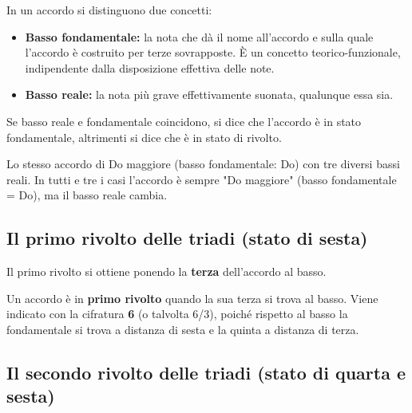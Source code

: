 \begin{definizione}
	\label{def:basso_fondamentale_reale}
	In un accordo si distinguono due concetti:
	\begin{itemize}
		\item \textbf{Basso fondamentale:} la nota che dà il nome all'accordo e sulla quale l'accordo è costruito per terze sovrapposte. È un concetto teorico-funzionale, indipendente dalla disposizione effettiva delle note.
		\item \textbf{Basso reale:} la nota più grave effettivamente suonata, qualunque essa sia.
	\end{itemize}
	
	Se basso reale e fondamentale coincidono, si dice che l'accordo è in stato fondamentale, altrimenti si dice che è in stato di rivolto.
	
\end{definizione}

\begin{esempio}
	\label{ex:basso_fond_reale}
	Lo stesso accordo di Do maggiore (basso fondamentale: Do) con tre diversi bassi reali.
	In tutti e tre i casi l'accordo è sempre "Do maggiore" (basso fondamentale = Do), ma il basso reale cambia.
\end{esempio}


\subsection{Il primo rivolto delle triadi (stato di sesta)}
\label{subsec:primo_rivolto}

Il primo rivolto si ottiene ponendo la \textbf{terza} dell'accordo al basso.

\begin{definizione}
	\label{def:primo_rivolto}
	Un accordo è in \textbf{primo rivolto} quando la sua terza si trova al basso. Viene indicato con la cifratura \textbf{6} (o talvolta 6/3), poiché rispetto al basso la fondamentale si trova a distanza di sesta e la quinta a distanza di terza.
\end{definizione}

\begin{esempio}
	\label{ex:primo_rivolto_triadi}
\end{esempio}

\subsection{Il secondo rivolto delle triadi (stato di quarta e sesta)}
\label{subsec:secondo_rivolto}

